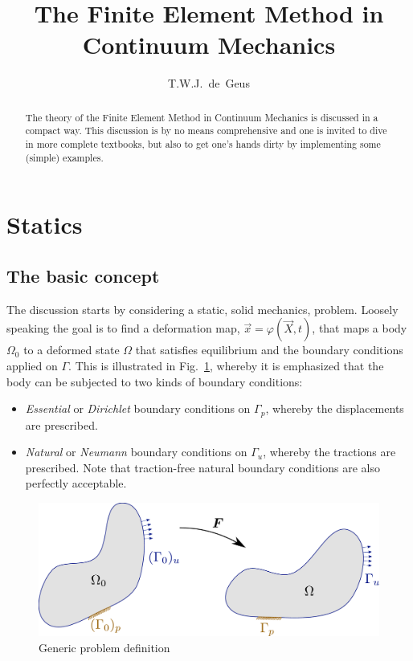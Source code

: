 \documentclass[times,namecite]{goose-article}
\title{%
  The Finite Element Method in Continuum Mechanics
}
\author{T.W.J.~de~Geus}
\begin{document}
\maketitle

\begin{abstract}
The theory of the Finite Element Method in Continuum Mechanics is discussed in a compact way. This discussion is by no means comprehensive and one is invited to dive in more complete textbooks, but also to get one's hands dirty by implementing some (simple) examples.
\end{abstract}

\setcounter{tocdepth}{2}
\tableofcontents

\section{Statics}

\subsection{The basic concept}

The discussion starts by considering a static, solid mechanics, problem. Loosely speaking the goal is to find a deformation map, $\vec{x} = \varphi(\vec{X},t)$, that maps a body $\Omega_0$ to a deformed state $\Omega$ that satisfies equilibrium and the boundary conditions applied on $\Gamma$. This is illustrated in Fig.~\ref{fig:problem}, whereby it is emphasized that the body can be subjected to two kinds of boundary conditions:
\begin{itemize}
  \item \emph{Essential} or \emph{Dirichlet} boundary conditions on $\Gamma_p$, whereby the displacements are prescribed.
  \item \emph{Natural} or \emph{Neumann} boundary conditions on $\Gamma_u$, whereby the tractions are prescribed. Note that traction-free natural boundary conditions are also perfectly acceptable.
\end{itemize}

\begin{figure}[htp]
  \centering
  \includegraphics[width=.5\textwidth]{figures/problem.pdf}
  \caption{Generic problem definition}
  \label{fig:problem}
\end{figure}
\end{document}
